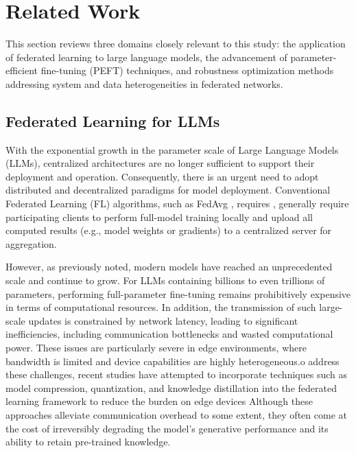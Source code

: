 \documentclass[journal]{IEEEtran}
\begin{document}
\section{Related Work}This section reviews three domains closely relevant to this study: the application of federated learning to large language models, the advancement of parameter-efficient fine-tuning (PEFT) techniques, and robustness optimization methods addressing system and data heterogeneities in federated networks.

\subsection{Federated Learning for LLMs}With the exponential growth in the parameter scale of Large Language Models (LLMs), centralized architectures are no longer sufficient to support their deployment and operation. Consequently, there is an urgent need to adopt distributed and decentralized paradigms for model deployment. Conventional Federated Learning (FL) algorithms, such as FedAvg \cite{mcmahan2017communication}, requires , generally require participating clients to perform full-model training locally and upload all computed results (e.g., model weights or gradients) to a centralized server for aggregation. 

However, as previously noted, modern models have reached an unprecedented scale and continue to grow. For LLMs containing billions to even trillions of parameters, performing full-parameter fine-tuning remains prohibitively expensive in terms of computational resources. In addition, the transmission of such large-scale updates is constrained by network latency, leading to significant inefficiencies, including communication bottlenecks and wasted computational power. These issues are particularly severe in edge environments, where bandwidth is limited and device capabilities are highly heterogeneous.o address these challenges, recent studies have attempted to incorporate techniques such as model compression, quantization, and knowledge distillation into the federated learning framework to reduce the burden on edge devices \cite{kairouz2021advances, mao2021communication} Although these approaches alleviate communication overhead to some extent, they often come at the cost of irreversibly degrading the model's generative performance and its ability to retain pre-trained knowledge.
\end{document}
